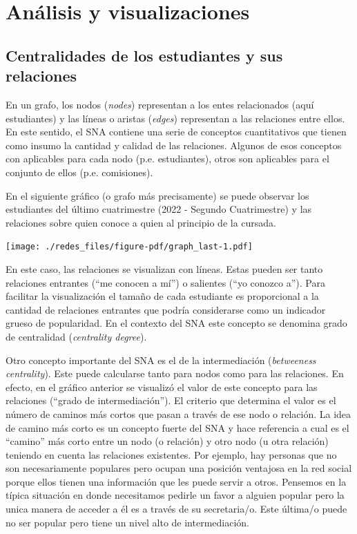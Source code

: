 \documentclass[
  letterpaper,
  DIV=11,
  numbers=noendperiod]{scrreprt}
\begin{document}
\hypertarget{anuxe1lisis-y-visualizaciones}{%
\section{Análisis y
visualizaciones}\label{anuxe1lisis-y-visualizaciones}}

\hypertarget{centralidades-de-los-estudiantes-y-sus-relaciones}{%
\subsection{Centralidades de los estudiantes y sus
relaciones}\label{centralidades-de-los-estudiantes-y-sus-relaciones}}

En un grafo, los nodos (\emph{nodes}) representan a los entes
relacionados (aquí estudiantes) y las líneas o aristas (\emph{edges})
representan a las relaciones entre ellos. En este sentido, el SNA
contiene una serie de conceptos cuantitativos que tienen como insumo la
cantidad y calidad de las relaciones. Algunos de esos conceptos con
aplicables para cada nodo (p.e. estudiantes), otros son aplicables para
el conjunto de ellos (p.e. comisiones).

En el siguiente gráfico (o grafo más precisamente) se puede observar los
estudiantes del último cuatrimestre (2022 - Segundo Cuatrimestre) y las
relaciones sobre quien conoce a quien al principio de la cursada.

\texttt{[image: ./redes\_files/figure-pdf/graph\_last-1.pdf]}

En este caso, las relaciones se visualizan con líneas. Estas pueden ser
tanto relaciones entrantes (``me conocen a mí'') o salientes (``yo
conozco a''). Para facilitar la visualización el tamaño de cada
estudiante es proporcional a la cantidad de relaciones entrantes que
podría considerarse como un indicador grueso de popularidad. En el
contexto del SNA este concepto se denomina grado de centralidad
(\emph{centrality degree}).

Otro concepto importante del SNA es el de la intermediación
(\emph{betweeness centrality}). Este puede calcularse tanto para nodos
como para las relaciones. En efecto, en el gráfico anterior se visualizó
el valor de este concepto para las relaciones (``grado de
intermediación''). El criterio que determina el valor es el número de
caminos más cortos que pasan a través de ese nodo o relación. La idea de
camino más corto es un concepto fuerte del SNA y hace referencia a cual
es el ``camino'' más corto entre un nodo (o relación) y otro nodo (u
otra relación) teniendo en cuenta las relaciones existentes. Por
ejemplo, hay personas que no son necesariamente populares pero ocupan
una posición ventajosa en la red social porque ellos tienen una
información que les puede servir a otros. Pensemos en la típica
situación en donde necesitamos pedirle un favor a alguien popular pero
la unica manera de acceder a él es a través de su secretaria/o. Este
última/o puede no ser popular pero tiene un nivel alto de
intermediación.
\end{document}
